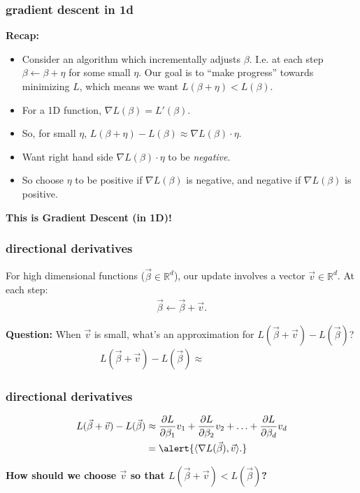 \documentclass[handout,compress]{beamer}
\newcommand{\R}{\mathbb{R}}
\begin{document}
\begin{frame}
	\frametitle{gradient descent in 1d}
	\textbf{Recap:}
	\begin{itemize}
		\item Consider an algorithm which incrementally adjusts $\beta$. I.e. at each step $\beta \leftarrow \beta + \eta$ for some small $\eta$. Our goal is to ``make progress'' towards minimizing $L$, which means we want $L(\beta + \eta) < L(\beta)$. 
		\item For a 1D function, $\nabla L(\beta) = L'(\beta)$.
		\item So, for small $\eta$, $L(\beta + \eta) - L(\beta) \approx \nabla L(\beta)\cdot \eta$.
		\item Want right hand side $\nabla L(\beta)\cdot \eta$ to be \emph{negative}. 
		\item So choose $\eta$ to be positive if $\nabla L(\beta)$ is negative, and negative if $\nabla L(\beta)$ is positive.
	\end{itemize}

	\begin{center}
		\textbf{\alert{This is Gradient Descent (in 1D)!}}
	\end{center}
\end{frame}

\begin{frame}[t]
	\frametitle{directional derivatives}
	For high dimensional functions ($\vec{\beta}\in \R^d$), our update involves a vector $\vec{v} \in \R^d$. At each step:
	\begin{align*}
		\vec{\beta} \leftarrow \vec{\beta} + \vec{v}.
	\end{align*}
	
	\textbf{Question:} When $\vec{v}$ is small, what's an approximation for $L(\vec{\beta} + \vec{v}) - L(\vec{\beta})$?
	\begin{align*}
 		L(\vec{\beta} + \vec{v}) - L(\vec{\beta}) \approx \hspace{6em}
	\end{align*}
\end{frame}

\begin{frame}[t]
	\frametitle{directional derivatives}
	\begin{align*}
	L(\vec{\beta} + \vec{v}) - L(\vec{\beta}) &\approx \frac{\partial L}{\partial\beta_1} v_1 + \frac{\partial L}{\partial\beta_2} v_2 + \ldots + \frac{\partial L}{\partial \beta_d} v_d  \\
	& = \alert{\langle \nabla L(\vec{\beta}), \vec{v}\rangle.}
	\end{align*}
	
	\textbf{How should we choose $\vec{v}$ so that $L(\vec{\beta} + \vec{v}) < L(\vec{\beta})$?} 
\end{frame}
\end{document}
